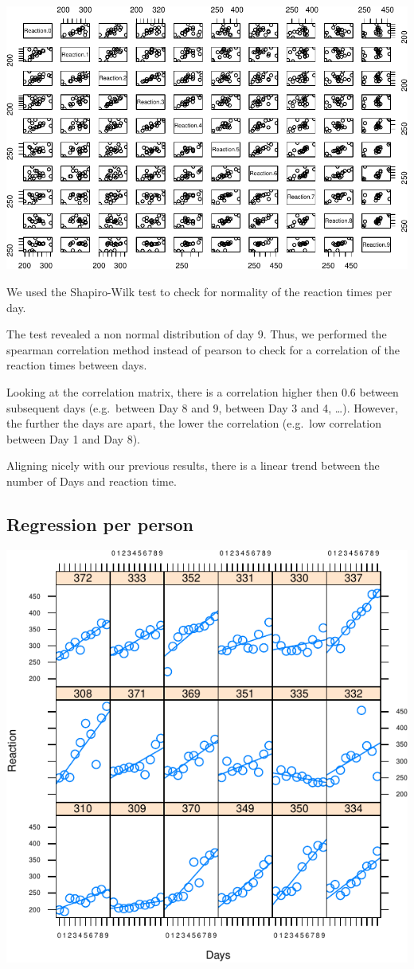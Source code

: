 \documentclass[
]{article}
\begin{document}
\begin{center}\includegraphics[width=0.8\linewidth]{Common_sleep_files/figure-latex/spearman-1} \end{center}

We used the Shapiro-Wilk test to check for normality of the reaction
times per day.

The test revealed a non normal distribution of day 9. Thus, we performed
the spearman correlation method instead of pearson to check for a
correlation of the reaction times between days.

Looking at the correlation matrix, there is a correlation higher then
0.6 between subsequent days (e.g.~between Day 8 and 9, between Day 3 and
4, \ldots). However, the further the days are apart, the lower the
correlation (e.g.~low correlation between Day 1 and Day 8).

Aligning nicely with our previous results, there is a linear trend
between the number of Days and reaction time.

\hypertarget{regression-per-person}{%
\subsection{Regression per person}\label{regression-per-person}}

\begin{center}\includegraphics[width=0.8\linewidth]{Common_sleep_files/figure-latex/trellis-1} \end{center}
\end{document}
